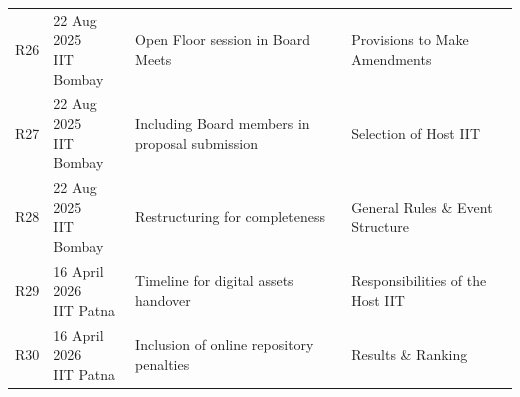 \begin{center}
\begin{longtable}{c m{3.2cm} m{6.2cm} m{3.5cm}}
R26 & \makecell[l]{22 Aug 2025\\ IIT Bombay} & Open Floor session in Board Meets &  Provisions to Make Amendments \\
R27 & \makecell[l]{22 Aug 2025\\ IIT Bombay} & Including Board members in proposal submission & Selection of Host IIT \\
R28 & \makecell[l]{22 Aug 2025\\ IIT Bombay} & Restructuring for completeness & General Rules \& Event Structure \\
R29 & \makecell[l]{16 April 2026\\ IIT Patna} & Timeline for digital assets handover & Responsibilities of the Host IIT \\
R30 & \makecell[l]{16 April 2026\\ IIT Patna} & Inclusion of online repository penalties & Results \& Ranking \\
\hline
\end{longtable}
\end{center}